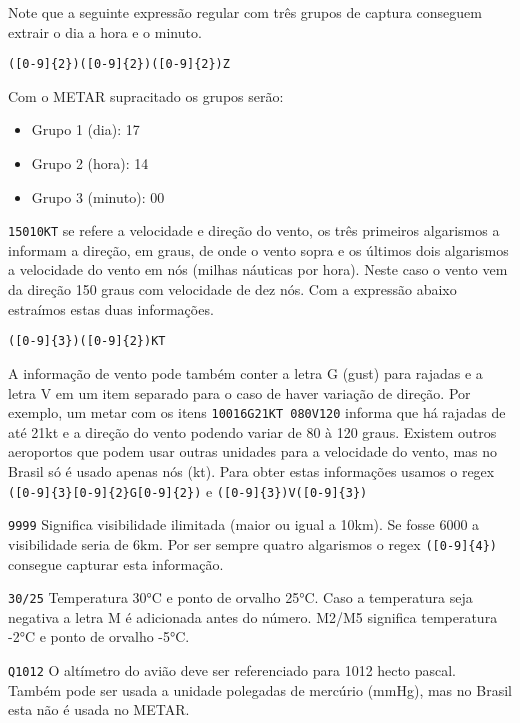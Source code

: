 Note que a seguinte expressão regular com três grupos de captura conseguem extrair o dia a hora e o minuto.

\begin{verbatim}
([0-9]{2})([0-9]{2})([0-9]{2})Z
\end{verbatim}

Com o METAR supracitado os grupos serão: 

\begin{itemize}
  \item Grupo 1 (dia): 17
  \item Grupo 2 (hora): 14
  \item Grupo 3 (minuto): 00
\end{itemize}

\texttt{15010KT} se refere a velocidade e direção do vento, os três primeiros algarismos a informam
a direção, em graus,
de onde o vento sopra e os últimos dois algarismos a velocidade do vento em nós (milhas
náuticas por hora). Neste caso o vento vem da direção 150 graus com velocidade de dez nós.
Com a expressão abaixo estraímos estas duas informações.

\begin{verbatim}
([0-9]{3})([0-9]{2})KT
\end{verbatim}

A informação de vento pode também conter a letra G (gust) para rajadas e a letra V
em um item separado para o caso de haver variação de direção. Por exemplo, um metar com os itens 
\texttt{10016G21KT 080V120} informa que há rajadas de
até 21kt e a direção do vento podendo variar de 80 à 120 graus. Existem outros aeroportos que podem usar 
outras unidades para a velocidade do vento, mas no Brasil só é usado apenas nós (kt). Para obter estas
informações usamos o regex \texttt{([0-9]\{3\}[0-9]\{2\}G{[0-9]\{2\}})} e \texttt{([0-9]\{3\})V([0-9]\{3\})}

\texttt{9999} Significa visibilidade ilimitada (maior ou igual a 10km). Se fosse 6000 a visibilidade 
seria de 6km. Por ser sempre quatro algarismos o regex \texttt{([0-9]\{4\})} consegue capturar esta informação.

\texttt{30/25} Temperatura 30°C e ponto de orvalho 25°C. Caso a temperatura seja negativa a letra M é adicionada
antes do número. M2/M5 significa temperatura -2°C e ponto de orvalho -5°C. \cite{METAR-help}

\texttt{Q1012} O altímetro do avião deve ser referenciado para 1012 hecto pascal. Também pode ser usada
a unidade polegadas de mercúrio (mmHg), mas no Brasil esta não é usada no METAR.

